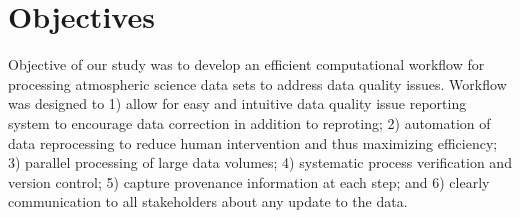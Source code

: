 \section{Objectives}
Objective of our study was to develop an efficient computational
workflow for processing atmospheric science data sets to address data
quality issues. Workflow was designed to 1) allow for easy and intuitive
data quality issue reporting system to encourage data correction in
addition to reproting; 2) automation of data reprocessing to reduce
human intervention and thus maximizing efficiency; 3) parallel
processing of large data volumes; 4) systematic process verification and
version control; 5) capture provenance information at each step; and 6)
clearly communication to all stakeholders about any update to the data.

